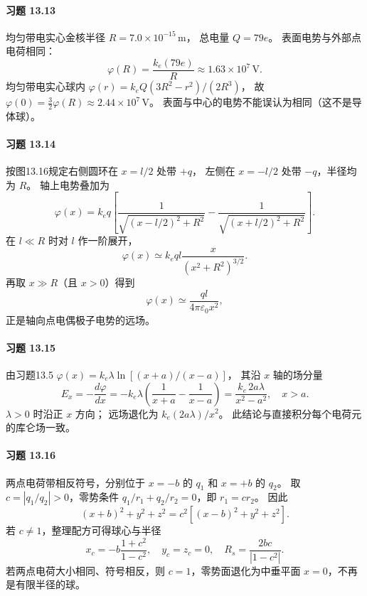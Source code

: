 \paragraph{习题 13.13}
均匀带电实心金核半径
\(R=7.0\times10^{-15}\,\mathrm m\)，
总电量 \(Q=79e\)。
表面电势与外部点电荷相同：
\[
 \boxed{\varphi(R)=\frac{k_e(79e)}R
 \approx1.63\times10^7\,\mathrm V}.
\]
均匀带电实心球内
\(\varphi(r)=k_eQ(3R^2-r^2)/(2R^3)\)，
故
\(\boxed{\varphi(0)=\tfrac32\varphi(R)
 \approx2.44\times10^7\,\mathrm V}\)。
表面与中心的电势不能误认为相同（这不是导体球）。

\paragraph{习题 13.14}
按图13.16规定右侧圆环在 \(x=l/2\) 处带 \(+q\)，
左侧在 \(x=-l/2\) 处带 \(-q\)，半径均为 \(R\)。
轴上电势叠加为
\[
 \boxed{\varphi(x)=k_eq
 \left[\frac1{\sqrt{(x-l/2)^2+R^2}}
 -\frac1{\sqrt{(x+l/2)^2+R^2}}\right]}.
\]
在 \(l\ll R\) 时对 \(l\) 作一阶展开，
\[
 \varphi(x)\simeq k_eql
 \frac{x}{(x^2+R^2)^{3/2}}.
\]
再取 \(x\gg R\)（且 \(x>0\)）得到
\[
 \boxed{\varphi(x)\simeq
 \frac{ql}{4\pi\varepsilon_0x^2}},
\]
正是轴向点电偶极子电势的远场。

\paragraph{习题 13.15}
由习题13.5
\(\varphi(x)=k_e\lambda\ln[(x+a)/(x-a)]\)，
其沿 \(x\) 轴的场分量
\[
 E_x=-\frac{d\varphi}{dx}
 =-k_e\lambda\left(\frac1{x+a}-\frac1{x-a}\right)
 =\boxed{\frac{k_e\,2a\lambda}{x^2-a^2}},\quad x>a.
\]
\(\lambda>0\) 时沿正 \(x\) 方向；
远场退化为 \(k_e(2a\lambda)/x^2\)。
此结论与直接积分每个电荷元的库仑场一致。

\paragraph{习题 13.16}
两点电荷带相反符号，分别位于
\(x=-b\) 的 \(q_1\) 和 \(x=+b\) 的 \(q_2\)。
取 \(c=|q_1/q_2|>0\)，零势条件
\(q_1/r_1+q_2/r_2=0\)，即
\(r_1=cr_2\)。
因此
\[
 (x+b)^2+y^2+z^2
 =c^2[(x-b)^2+y^2+z^2].
\]
若 \(c\ne1\)，整理配方可得球心与半径
\[
 \boxed{x_c=-b\frac{1+c^2}{1-c^2},\quad
 y_c=z_c=0,\quad
 R_s=\frac{2bc}{|1-c^2|}}.
\]
若两点电荷大小相同、符号相反，则
\(c=1\)，零势面退化为中垂平面
\(\boxed{x=0}\)，不再是有限半径的球。

